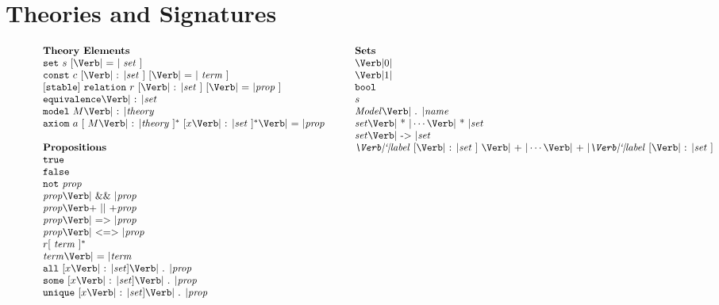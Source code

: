 
\section{Theories and Signatures}
\label{sec:theories-signatures}

\begin{figure*}[t]
\[
\footnotesize
\renewcommand{\arraystretch}{1.0}
\begin{array}[t]{l}
\mbox{\textbf{Theory Elements}}\\
\SET\ s\ [\EQUALS\ \mathit{set}\ ]\\
\CONST\ c\ [\COLON \mathit{set}\ ]\ [\EQUALS\ \mathit{term}\ ]\\
{}[\STABLE{}]\ \RELATION\ r\ [\COLON \mathit{set}\ ]\ [\EQUALS \mathit{prop}\ ]\\
\EQUIVALENCE \COLON \mathit{set}\\
\MODEL\ M\COLON\mathit{theory}\\
\AXIOM\ a\ [\ M\COLON\mathit{theory}\ ]^{*}\ [x\COLON\mathit{set}\ ]^*\EQUALS\mathit{prop}\\
\\
\mbox{\textbf{Propositions}}\\
\TRUE\\
\FALSE\\
\NOT\ \Prop\\
\Prop \AAND \Prop\\
\Prop \OOR \Prop\\
\Prop \IIMPLY \Prop\\
\Prop \IIFF \Prop\\
r [\ \Term\ ]^*\\
\Term\EQUALS\Term\\ %
\ALL\ [x\COLON \Set] \PERIOD \Prop\\
\SOME\ [x\COLON \Set] \PERIOD \Prop\\
\UNIQUE\ [x\COLON \Set] \PERIOD \Prop\\
\end{array}
\qquad
\begin{array}[t]{l}
\mbox{\textbf{Sets}}\\
\ZERO\\
\ONE\\
\BOOL\\
s\\
\mathit{Model}\PERIOD \mathit{name}\\
\Set \TIMES \cdots \TIMES \Set\\
\Setexp \ARROW \Setexp\\
\Label\ [\COLON \Setexp\ ]\ \PLUS \cdots \PLUS \Label\ [\COLON \Setexp\ ]\\

\end{array}\]
\end{figure*}
